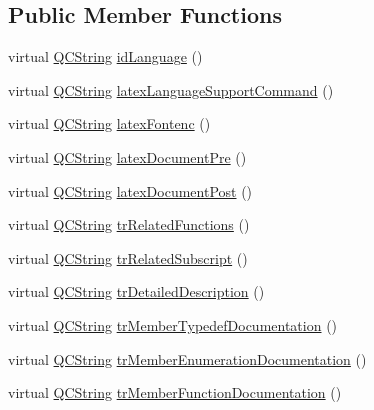 \subsection*{Public Member Functions}
\begin{DoxyCompactItemize}
\item 
virtual \mbox{\hyperlink{class_q_c_string}{Q\+C\+String}} \mbox{\hyperlink{class_translator_chinese_a76318096a57cb3970e9c09b51d8ef215}{id\+Language}} ()
\item 
virtual \mbox{\hyperlink{class_q_c_string}{Q\+C\+String}} \mbox{\hyperlink{class_translator_chinese_a561c2a69223ffe8042cc1196b32d65c5}{latex\+Language\+Support\+Command}} ()
\item 
virtual \mbox{\hyperlink{class_q_c_string}{Q\+C\+String}} \mbox{\hyperlink{class_translator_chinese_a175c453b04357c5b3646e92137783345}{latex\+Fontenc}} ()
\item 
virtual \mbox{\hyperlink{class_q_c_string}{Q\+C\+String}} \mbox{\hyperlink{class_translator_chinese_aab889b0b3d8f44915e8b56ecf9e3e5df}{latex\+Document\+Pre}} ()
\item 
virtual \mbox{\hyperlink{class_q_c_string}{Q\+C\+String}} \mbox{\hyperlink{class_translator_chinese_a86bc64cb27dd2bac8ae17f9cc51800e8}{latex\+Document\+Post}} ()
\item 
virtual \mbox{\hyperlink{class_q_c_string}{Q\+C\+String}} \mbox{\hyperlink{class_translator_chinese_a33d355b882bf23b7d745d21cc0465a60}{tr\+Related\+Functions}} ()
\item 
virtual \mbox{\hyperlink{class_q_c_string}{Q\+C\+String}} \mbox{\hyperlink{class_translator_chinese_ad2c6aa905dbbf109f106930ed9cb6100}{tr\+Related\+Subscript}} ()
\item 
virtual \mbox{\hyperlink{class_q_c_string}{Q\+C\+String}} \mbox{\hyperlink{class_translator_chinese_a3c57752f0aae9b5b39c2e511d985c220}{tr\+Detailed\+Description}} ()
\item 
virtual \mbox{\hyperlink{class_q_c_string}{Q\+C\+String}} \mbox{\hyperlink{class_translator_chinese_af8165d91f39f03a0368f33c2406707ea}{tr\+Member\+Typedef\+Documentation}} ()
\item 
virtual \mbox{\hyperlink{class_q_c_string}{Q\+C\+String}} \mbox{\hyperlink{class_translator_chinese_a97c922af04ab63e93019e38759561c37}{tr\+Member\+Enumeration\+Documentation}} ()
\item 
virtual \mbox{\hyperlink{class_q_c_string}{Q\+C\+String}} \mbox{\hyperlink{class_translator_chinese_a3d85a6d49de66d45666ca12daa8098c6}{tr\+Member\+Function\+Documentation}} ()

\end{DoxyCompactItemize}
